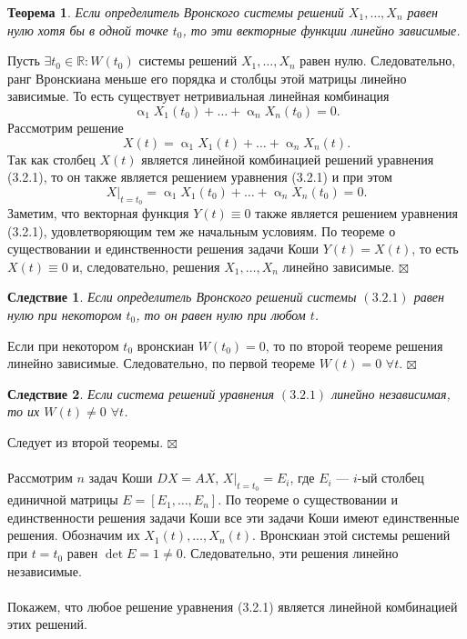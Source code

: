 \documentclass[a4paper, 12pt]{report}
\newenvironment{Proof} %
{\par\noindent{$\blacklozenge$}} %
{\hfill$\scriptstyle\boxtimes$}
\newcommand{\Rm}{\mathbb{R}}
\renewcommand{\alpha}{\upalpha}
\newtheorem*{theorem}{Теорема}
\newtheorem*{cor}{Следствие}
\begin{document}
\begin{theorem}
	Если определитель Вронского системы решений  $X_1,\ldots,X_n$ равен нулю хотя бы в одной точке $t_0$, то эти векторные функции линейно зависимые.
\end{theorem}\begin{Proof}
Пусть $\exists t_0 \in \Rm : W(t_0)$ системы решений $X_1,\ldots,X_n$ равен нулю. Следовательно, ранг Вронскиана меньше его порядка и столбцы этой матрицы линейно зависимые. То есть существует нетривиальная линейная комбинация $$\alpha_1X_1(t_0) + \ldots +  \alpha_nX_n(t_0) = 0.$$ Рассмотрим решение $$X(t) =  \alpha_1X_1(t) + \ldots +  \alpha_nX_n(t).$$ Так как столбец $X(t)$ является линейной комбинацией решений уравнения (3.2.1), то он также является решением уравнения (3.2.1) и при этом $$X|_{t=t_0} =  \alpha_1X_1(t_0) + \ldots +  \alpha_nX_n(t_0) = 0.$$
Заметим, что векторная функция $Y(t)\equiv 0$ также является решением уравнения (3.2.1), удовлетворяющим тем же начальным условиям. По теореме о существовании и единственности решения задачи Коши $Y(t) = X(t)$, то есть $X(t)\equiv 0$ и, следовательно, решения $X_1,\ldots,X_n$ линейно зависимые.
\end{Proof}
\begin{cor}
	Если определитель Вронского решений системы $(3.2.1)$ равен нулю при некотором $t_0$, то он равен нулю при любом $t$.
\end{cor}\begin{Proof}
Если при некотором $t_0$ вронскиан $W(t_0) = 0 $, то по второй теореме решения линейно зависимые. Следовательно, по первой теореме $W(t) = 0$ $\forall t$.
\end{Proof}\begin{cor}
Если система решений уравнения $(3.2.1)$ линейно независимая, то их $W(t) \ne 0$ $\forall t$.
\end{cor}\begin{Proof}
Следует из второй теоремы.
\end{Proof}\\\\
Рассмотрим $n$ задач Коши $DX = AX$, $X|_{t=t_0} = E_i$, где $E_i$ --- $i$-ый столбец единичной матрицы $E = [E_1,\ldots, E_n]$. По теореме о существовании и единственности решения задачи Коши все эти задачи Коши имеют единственные решения. Обозначим их $X_1(t),\ldots,X_n(t)$. Вронскиан этой системы решений при $t=t_0$ равен $\det E = 1\ne 0$. Следовательно, эти решения линейно независимые.\\\\ Покажем, что любое решение уравнения (3.2.1) является линейной комбинацией этих решений.
\end{document}
